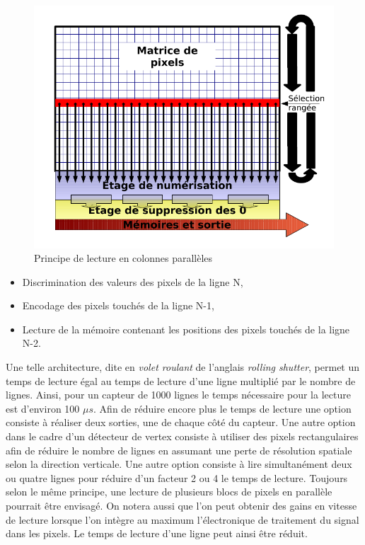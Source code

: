   \begin{figure}[!htb]
    \begin{center} 
      \includegraphics[scale=0.32]{./figures/rolling_shutter.png}
      \caption{Principe de lecture en colonnes parall\`eles}
      \label{fig:rolling_shutter}
    \end{center}
  \end{figure}
   
   \medskip
   
   \renewcommand{\labelitemi}{$\bullet$}
   \begin{itemize}
    \item Discrimination des valeurs des pixels de la ligne N,
    \item Encodage des pixels touch\'es de la ligne N-1,
    \item Lecture de la m\'emoire contenant les positions des pixels touch\'es de la ligne N-2.
   \end{itemize}
  
  \medskip 
   
   Une telle architecture, dite en \textit{volet roulant} de l'anglais \textit{rolling shutter}, permet un temps de lecture \'egal au temps de lecture d'une ligne multipli\'e par le nombre de lignes. Ainsi, pour un capteur de 1000 lignes le temps n\'ecessaire pour la lecture est d'environ 100 $\mu s$. Afin de r\'eduire encore plus le temps de lecture une option consiste \`a r\'ealiser deux sorties, une de chaque côt\'e du capteur. Une autre option dans le cadre d'un d\'etecteur de vertex consiste \`a utiliser des pixels rectangulaires afin de r\'eduire le nombre de lignes en assumant une perte de r\'esolution spatiale selon la direction verticale. Une autre option consiste \`a lire simultan\'ement deux ou quatre lignes pour r\'eduire d'un facteur 2 ou 4 le temps de lecture. Toujours selon le m\^eme principe, une lecture de plusieurs blocs de pixels en parall\`ele pourrait \^etre envisag\'e. On notera aussi que l'on peut obtenir des gains en vitesse de lecture lorsque l'on int\`egre au maximum l'\'electronique de traitement du signal dans les pixels. Le temps de lecture d'une ligne peut ainsi \^etre r\'eduit.
   
